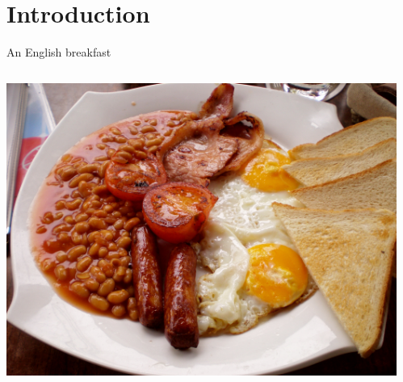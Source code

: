 
\section{Introduction}

\begin{frame}{An English breakfast}

\begin{columns}[c]
\begin{column}{0.65\textwidth}
	\includegraphics[width=\columnwidth]{figures/englishBreakfast.jpg}
\end{column}
\begin{column}{0.35\textwidth}

\end{column}
\end{columns}
\end{frame}
